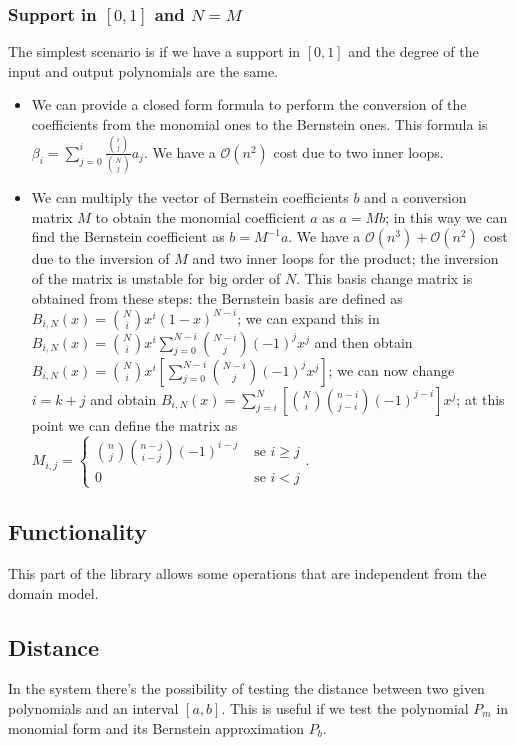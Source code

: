 \subsubsection{Support in $[0,1]$ and $N=M$}
\label{subsec:monomial_approximation_support_0_1_N_equal_M}
The simplest scenario is if we have a support in $[0,1]$ and the degree of the input and output polynomials are the same.
\begin{itemize}
    \item We can provide a closed form formula to perform the conversion of the coefficients from the monomial ones to the Bernstein ones. This formula is $\displaystyle\beta_i = \sum_{j=0}^{i} \frac{\binom{i}{j}}{\binom{N}{j}} a_j$. We have a $\mathcal{O}(n^2)$ cost due to two inner loops.
    \item We can multiply the vector of Bernstein coefficients $b$ and a conversion matrix $M$ to obtain the monomial coefficient $a$ as $a=Mb$; in this way we can find the Bernstein coefficient as $b=M^{-1}a$. We have a $\mathcal{O}(n^3)+\mathcal{O}(n^2)$ cost due to the inversion of $M$ and two inner loops for the product; the inversion of the matrix is unstable for big order of $N$. This basis change matrix is obtained from these steps: the Bernstein basis are defined as $\displaystyle B_{i,N}(x) = \binom{N}{i} x^i (1-x)^{N-i}$; we can expand this in $\displaystyle B_{i,N}(x) = \binom{N}{i} x^i \sum_{j=0}^{N-i} \binom{N-i}{j} (-1)^j x^j$ and then obtain $\displaystyle B_{i,N}(x) = \binom{N}{i} x^i \left[ \sum_{j=0}^{N-i} \binom{N-i}{j} (-1)^j x^j \right]$; we can now change $i = k + j$ and obtain $\displaystyle B_{i,N}(x) = \sum_{j=i}^{N} \left[ \binom{N}{i} \binom{n-i}{j-i} (-1)^{j-i} \right] x^j$; at this point we can define the matrix as $M_{i,j} = \begin{cases} \binom{n}{j} \binom{n-j}{i-j} (-1)^{i-j} & \text{ se } i \ge j \\ 0 & \text{ se } i < j \end{cases}$.
\end{itemize}

\subsection{Functionality}
This part of the library allows some operations that are independent from the domain model.
\subsection{Distance}
In the system there's the possibility of testing the distance between two given polynomials and an interval $[a,b]$. This is useful if we test the polynomial $P_m$ in monomial form and its Bernstein approximation $P_b$.

